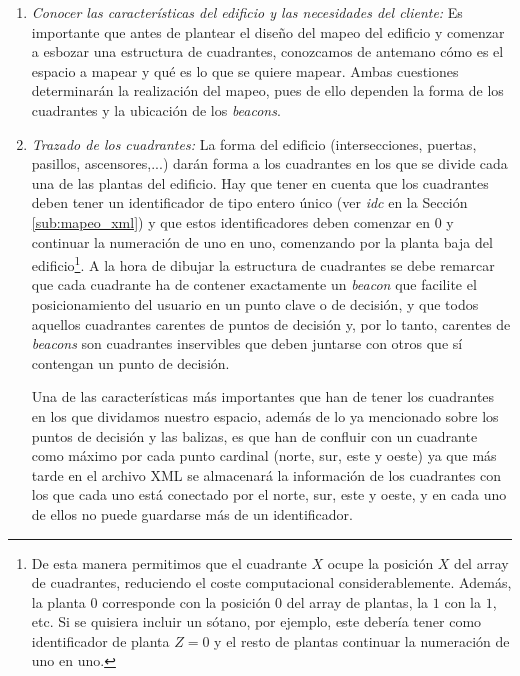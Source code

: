 \begin{enumerate}
	\item \textit{Conocer las características del edificio y las necesidades del cliente:} Es importante que antes de plantear el diseño del mapeo del edificio y comenzar a esbozar una estructura de cuadrantes, conozcamos de antemano cómo es el espacio a mapear y qué es lo que se quiere mapear. Ambas cuestiones determinarán la realización del mapeo, pues de ello dependen la forma de los cuadrantes y la ubicación de los \textit{beacons}. 
	
	\item \textit{Trazado de los cuadrantes:} La forma del edificio (intersecciones, puertas, pasillos, ascensores,...) darán forma a los cuadrantes en los que se divide cada una de las plantas del edificio. Hay que tener en cuenta que los cuadrantes deben tener un identificador de tipo entero único (ver \textit{idc} en la Sección \ref{sub:mapeo_xml}) y que estos identificadores deben comenzar en $0$ y continuar la numeración de uno en uno, comenzando por la planta baja del edificio\footnote{De esta manera permitimos que el cuadrante $X$ ocupe la posición $X$ del array de cuadrantes, reduciendo el coste computacional considerablemente. Además, la planta $0$ corresponde con la posición $0$ del array de plantas, la $1$ con la $1$, etc. Si se quisiera incluir un sótano, por ejemplo, este debería tener como identificador de planta $Z = 0$ y el resto de plantas continuar la numeración de uno en uno.}. A la hora de dibujar la estructura de cuadrantes se debe remarcar que cada cuadrante ha de contener exactamente un \textit{beacon} que facilite el posicionamiento del usuario en un punto clave o de decisión, y que todos aquellos cuadrantes carentes de puntos de decisión y, por lo tanto, carentes de \textit{beacons} son cuadrantes inservibles que deben juntarse con otros que sí contengan un punto de decisión.
	
	Una de las características más importantes que han de tener los cuadrantes en los que dividamos nuestro espacio, además de lo ya mencionado sobre los puntos de decisión y las balizas, es que han de confluir con un cuadrante como máximo por cada punto cardinal (norte, sur, este y oeste) ya que más tarde en el archivo XML se almacenará la información de los cuadrantes con los que cada uno está conectado por el norte, sur, este y oeste, y en cada uno de ellos no puede guardarse más de un identificador.
	

\end{enumerate}
